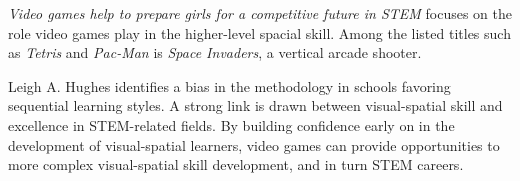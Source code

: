 \textit{Video games help to prepare girls for a competitive future in STEM} focuses on
the role video games play in the higher-level spacial skill. Among the listed
titles such as \textit{Tetris} and \textit{Pac-Man} is \textit{Space Invaders},
a vertical arcade shooter.\citep{Hughes2017}

Leigh A. Hughes identifies a bias in the methodology in schools favoring
sequential learning styles. A strong link is drawn between visual-spatial skill
and excellence in STEM-related fields. By building confidence early on in the
development of visual-spatial learners, video games can provide opportunities
to more complex visual-spatial skill development, and in turn STEM careers.
